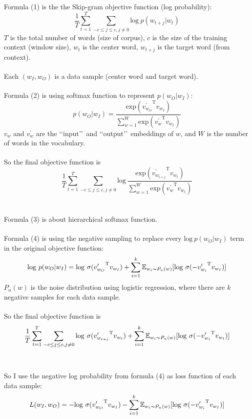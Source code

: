 \documentclass[12pt,a4paper,twoside]{book}
\begin{document}
	Formula (1) is the the Skip-gram objective function (log probability): 
	$$\frac{1}{T} \sum_{t=1}^{T} \sum_{-c\leq j\leq c, j\neq 0} \mathrm{log}\ p(w_{t+j}|w_{t}) $$
	$T$ is the total number of words (size of corpus), $c$ is the size of the training context (window size), $w_t$ is the center word, $w_{t+j}$ is the target word (from context).  \\
\\
	Each $(w_I, w_O)$ is a data sample (center word and target word). \\
\\
	Formula (2) is using softmax function to represent $p(w_O|w_I)$:
	$$p(w_O|w_I) = \frac{\mathrm{exp}({v^\prime_{w_O}}^{\mathrm{T}}v_{w_I})}{\sum_{w=1}^{W}\mathrm{exp}({v^\prime_{w}}^{\mathrm{T}}v_{w_I})}$$
	$v_w$ and $v^\prime_w$ are the \lq\lq input\rq\rq\ and \lq\lq output\rq\rq\ embeddings of $w$, and $W$ is the number of words in the vocabulary.\\
\\
	So the final objective function is $$\frac{1}{T} \sum_{t=1}^{T} \sum_{-c\leq j\leq c, j\neq 0} \mathrm{log}\ \frac{\mathrm{exp}({v^\prime_{w_{t+j}}}^{\mathrm{T}}v_{w_t})}{\sum_{w=1}^{W}\mathrm{exp}({v^\prime_{w}}^{\mathrm{T}}v_{w_t})} $$
\\
\\
	Formula (3) is about hierarchical softmax function.\\
	\\
	Formula (4) is using the negative sampling to replace every $\mathrm{log}\ p(w_O|w_I)$ term in the original objective function: 
	$$\mathrm{log}\ p(w_O|w_I) = \mathrm{log}\ \sigma({v^\prime_{w_O}}^{\mathrm{T}}v_{w_I})+\sum_{i=1}^k \mathbb{E}_{w_i\thicksim P_n(w)}[\mathrm{log}\ \sigma(-{v^\prime_{w_i}}^{\mathrm{T}}v_{w_I})]$$	
	$P_n(w)$ is the noise distribution using logistic regression, where there are $k$ negative samples for each data sample.\\
\\
	So the final objective function is $$\frac{1}{T} \sum_{t=1}^{T} \sum_{-c\leq j\leq c, j\neq 0} \mathrm{log}\ \sigma({v^\prime_{w_{t+j}}}^{\mathrm{T}}v_{w_t})+\sum_{i=1}^k \mathbb{E}_{w_i\thicksim P_n(w)}[\mathrm{log}\ \sigma(-{v^\prime_{w_i}}^{\mathrm{T}}v_{w_t})]$$ 
	\\
	  \\  
	So I use the negative log probability from formula (4) as loss function of each data sample:
	$$L(w_I,w_O)=-\mathrm{log}\ \sigma({v^\prime_{w_O}}^{\mathrm{T}}v_{w_I})-\sum_{i=1}^k \mathbb{E}_{w_i\thicksim P_n(w)}[\mathrm{log}\ \sigma(-{v^\prime_{w_i}}^{\mathrm{T}}v_{w_I})]$$
\end{document}

